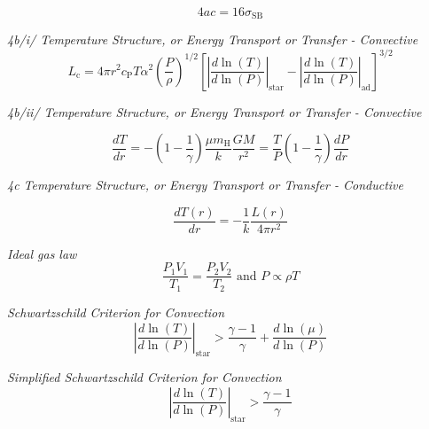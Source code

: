 \documentclass{article}
\begin{document}
\begin{equation}
4ac = 16 \sigma_\mathrm{SB}
\end{equation}

\textit {4b/i/ Temperature Structure, or Energy Transport or Transfer - Convective}
\begin{equation}
L_\mathrm{c} = 4 \pi r^2 c_\mathrm{P} T \alpha^2 \left(\frac{P}{\rho}\right)^{1/2} \left[\left| \frac {d\ln(T)}{d\ln(P)} \right |_\mathrm{star} - \left| \frac {d\ln(T)}{d\ln(P)} \right |_\mathrm{ad}  \right]^{3/2}
\end{equation}

\textit {4b/ii/ Temperature Structure, or Energy Transport or Transfer - Convective}


\begin{equation}
\frac{dT}{dr} = - \left( 1 - \frac{1}{\gamma} \right) \frac{\mu m_\mathrm{H}}{k} \frac{G M}{r^2} = \frac{T}{P} \left( 1 - \frac{1}{\gamma} \right) \frac{dP}{dr}
\end{equation}

\textit {4c Temperature Structure, or Energy Transport or Transfer - Conductive}


\begin{equation}
\frac{dT(r)}{dr} = - \frac{1}{k} \frac{L(r)}{4 \pi r^2}
\end{equation}



\textit{Ideal gas law}
\begin{equation}
\frac{P_1 V_1}{T_1} = \frac{P_2 V_2}{T_2} \text{ and } P \propto \rho T
\end{equation}

\textit {Schwartzschild Criterion for Convection}
\begin{equation}
\left| \frac {d\ln(T)}{d\ln(P)} \right |_\mathrm{star} > \frac {\gamma -1}{\gamma} + \frac {d\ln(\mu)}{d\ln(P)}
\end{equation}




\textit{Simplified Schwartzschild Criterion for Convection}
\begin{equation}
\left| \frac {d\ln(T)}{d\ln(P)} \right |_\mathrm{star} > \frac {\gamma -1}{\gamma}
\end{equation}
\end{document}
